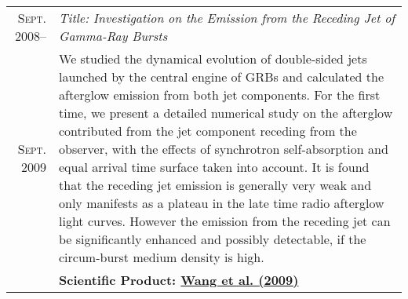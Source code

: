 \documentclass[letterpaper,10pt]{article}
\begin{document}
\begin{longtable}{r|p{5.5in}}
  \textsc{Sept. 2008}--  &   \emph{Title: Investigation on the Emission from the Receding Jet of Gamma-Ray Bursts}   \\
  \textsc{Sept. 2009}    &   \small{We studied the dynamical evolution of double-sided jets launched by 
  the central engine of GRBs and calculated the afterglow emission from both jet components. For the first time, we present a 
  detailed numerical study on the afterglow contributed from the jet component receding from the observer, with the effects of 
  synchrotron self-absorption and equal arrival time surface taken into account. It is found that the receding jet emission is 
  generally very weak and only manifests as a plateau in the late time radio afterglow light curves. However the emission from the 
  receding jet can be significantly enhanced and possibly detectable, if the circum-burst medium density is high.} \\
  &   \textbf{Scientific Product: \hyperlink{09.wang.aa}{Wang et al. (2009)}} \\
\end{longtable}

\end{document}
